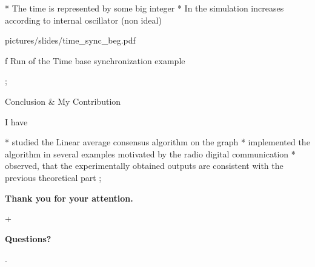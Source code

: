 * The time is represented by some big integer
* In the simulation increases according to internal oscillator (non ideal) 

\centerline{\picw=15cm \inspic pictures/slides/time_sync_beg.pdf } 
\caption/f Run of the Time base synchronization example



\pg;








\sec Conclusion \& My Contribution

I have 

* studied the Linear average consensus algorithm on the graph 
* implemented the  algorithm in  several examples motivated by the radio digital communication
* observed, that the experimentally obtained outputs are consistent with the previous theoretical part
\pg;

\null
\vskip2cm
\centerline{\typosize[35/40]\bf Thank you for your attention.}\pg+

\vskip2cm
\centerline{\Blue\typosize[60/70]\bf Questions?}

\pg. %

